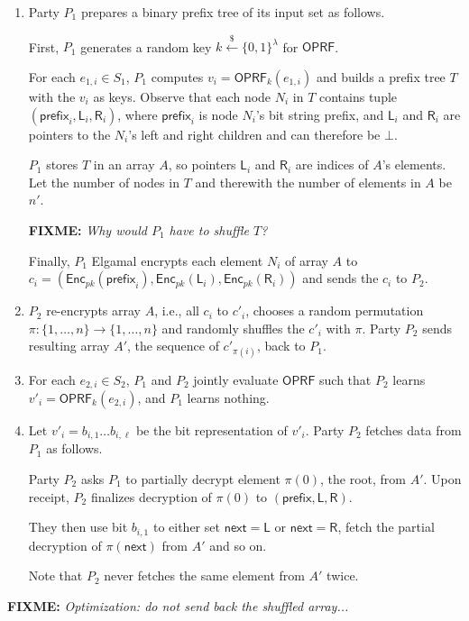 \documentclass{article}
\newcommand{\oprf}[0]{\mathsf{OPRF}}
\newcommand{\getr}[0]{\stackrel{\$}{\leftarrow}}
\newcommand{\enc}[0]{{\mathsf{Enc}}}
\newcommand{\fixme}[1]{{\bf FIXME:} {\emph{#1}}}
\begin{document}
\begin{enumerate}[label={\bf Step {\arabic*}:},leftmargin=*]
\item Party $P_1$ prepares a binary prefix tree of its input set as follows.

  First, $P_1$ generates a random key $k\getr\{0,1\}^\lambda$ for $\oprf$.

  For each $e_{1,i}\in{}S_1$, $P_1$ computes $v_i=\oprf_k(e_{1,i})$
  and builds a prefix tree $T$ with the $v_i$ as keys. Observe that
  each node $N_i$ in $T$ contains tuple
  $(\mathsf{prefix}_i,\mathsf{L}_i,\mathsf{R}_i)$, where
  $\mathsf{prefix}_i$ is node $N_i$'s bit string prefix, and
  $\mathsf{L}_i$ and $\mathsf{R}_i$ are pointers to the $N_i$'s left
  and right children and can therefore be $\bot$.

  $P_1$ stores $T$ in an array $A$, so pointers $\mathsf{L}_i$ and
  $\mathsf{R}_i$ are indices of $A$'s elements. Let the number
  of nodes in $T$ and therewith the number of elements in $A$ be
  $n'$.

  \fixme{Why would $P_1$ have to shuffle $T$?}
  
  Finally, $P_1$ Elgamal encrypts each element $N_i$ of array $A$ to
  $c_i=(\enc_{pk}(\mathsf{prefix}_i),\enc_{pk}(\mathsf{L}_i),\enc_{pk}(\mathsf{R}_i))$
  and sends the $c_i$ to $P_2$.

\item $P_2$ re-encrypts array $A$, i.e., all $c_i$ to $c'_i$, chooses
  a random permutation $\pi:\{1,\ldots,n\}\rightarrow\{1,\ldots,n\}$
  and randomly shuffles the $c'_i$ with $\pi$. Party $P_2$ sends
  resulting array $A'$, the sequence of $c'_{\pi(i)}$, back to $P_1$.

\item For each $e_{2,i}\in{}S_2$, $P_1$ and $P_2$ jointly evaluate
  $\oprf$ such that $P_2$ learns $v'_i=\oprf_k(e_{2,i})$, and $P_1$
  learns nothing.

\item Let $v'_i=b_{i,1}\ldots{}b_{i,\ell}$ be the bit representation
  of $v'_i$. Party $P_2$ fetches data from $P_1$ as follows.

  Party $P_2$ asks $P_1$ to partially decrypt element $\pi(0)$, the
  root, from $A'$. Upon receipt, $P_2$ finalizes decryption of
  $\pi(0)$ to $(\mathsf{prefix},\mathsf{L},\mathsf{R})$.

  They then use bit $b_{i,1}$ to either set
  ${\mathsf{next}}=\mathsf{L}$ or ${\mathsf{next}}=\mathsf{R}$, fetch
  the partial decryption of $\pi({\mathsf{next}})$ from $A'$ and so on.

  Note that $P_2$ never fetches the same element from $A'$ twice. 
  
\end{enumerate}

\fixme{Optimization: do not send back the shuffled array...}
\end{document}
